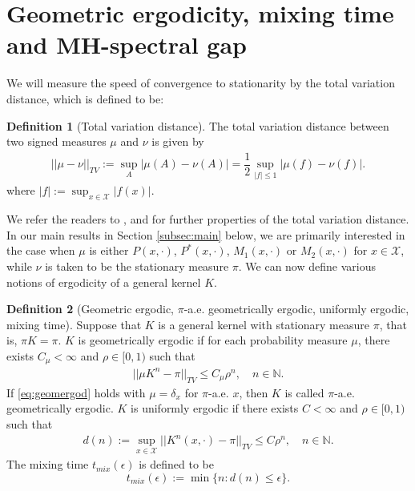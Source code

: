 \documentclass[12pt,a4]{amsart}
\numberwithin{equation}{section}
\theoremstyle{plain}
\theoremstyle{definition}
\newtheorem{definition}{Definition}[section]
\theoremstyle{remark}
\newcommand{\1}{\mathds{1}}
\renewcommand{\leq}{\leqslant}
\begin{document}
\section{Geometric ergodicity, mixing time and MH-spectral gap}\label{sec:geomergodMHspecgap}

We will measure the speed of convergence to stationarity by the total variation distance, which is defined to be:

\begin{definition}[Total variation distance]\label{def:tv}%
	The total variation distance between two signed measures $\mu$ and $\nu$ is given by
	\begin{align*}
		||\mu - \nu||_{TV} := \sup_{A} |\mu(A) - \nu(A)| = \dfrac{1}{2} \sup_{|f| \leq 1} |\mu(f) - \nu(f)|.
	\end{align*}
	where $|f| := \sup_{x \in \mathcal{X}} |f(x)|$.	
\end{definition}

We refer the readers to \cite{LPW09}, \cite{MT09} and \cite{RR04} for further properties of the total variation distance. In our main results in Section \ref{subsec:main} below, we are primarily interested in the case when $\mu$ is either $P(x,\cdot)$, $P^*(x,\cdot)$, $M_1(x,\cdot)$ or $M_2(x,\cdot)$ for $x \in \mathcal{X}$, while $\nu$ is taken to be the stationary measure $\pi$. We can now define various notions of ergodicity of a general kernel $K$.

\begin{definition}[Geometric ergodic, $\pi$-a.e. geometrically ergodic, uniformly ergodic, mixing time]\label{def:geomergod}
	Suppose that $K$ is a general kernel with stationary measure $\pi$, that is, $\pi K = \pi$. $K$ is geometrically ergodic if for each probability measure $\mu$, there exists $C_\mu< \infty$ and $\rho \in [0,1)$ such that
	\begin{align}\label{eq:geomergod}
		||\mu K^n - \pi ||_{TV} \leq C_{\mu} \rho^n, \quad n \in \mathbb{N}.
	\end{align}
	If \eqref{eq:geomergod} holds with $\mu = \delta_x$ for $\pi$-a.e. $x$, then $K$ is called $\pi$-a.e. geometrically ergodic. $K$ is uniformly ergodic if there exists $C < \infty$ and $\rho \in [0,1)$ such that
	\begin{align}\label{eq:unifergod}
	d(n) := \sup_{x \in \mathcal{X}}||K^n(x,\cdot) - \pi ||_{TV} \leq C \rho^n, \quad n \in \mathbb{N}.
	\end{align}
	The mixing time $t_{mix}(\epsilon)$ is defined to be
	$$t_{mix}(\epsilon) := \min \{ n : d(n) \leq \epsilon\}.$$
\end{definition}
\end{document}
